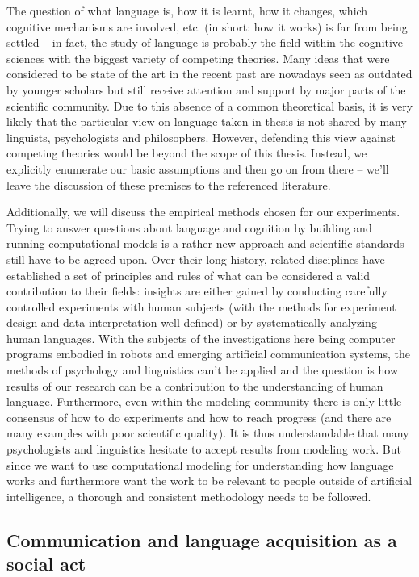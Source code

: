 The question of what language is, how it is learnt, how it changes,
which cognitive mechanisms are involved, etc. (in short: how it works)
is far from being settled -- in fact, the study of language is
probably the field within the cognitive sciences with the biggest
variety of competing theories. Many ideas that were considered to be
state of the art in the recent past are nowadays seen as outdated by
younger scholars but still receive attention and support by major
parts of the scientific community. Due to this absence of a common
theoretical basis, it is very likely that the particular view on
language taken in thesis is not shared by many linguists,
psychologists and philosophers. However, defending this view against
competing theories would be beyond the scope of this thesis. Instead,
we explicitly enumerate our basic assumptions and then go on from
there -- we'll leave the discussion of these premises to the
referenced literature.

Additionally, we will discuss the empirical methods chosen for our
experiments. Trying to answer questions about language and cognition
by building and running computational models is a rather new approach
and scientific standards still have to be agreed upon. Over their long
history, related disciplines have established a set of principles and
rules of what can be considered a valid contribution to their fields:
insights are either gained by conducting carefully controlled
experiments with human subjects (with the methods for experiment
design and data interpretation well defined) or by systematically
analyzing human languages. With the subjects of the investigations
here being computer programs embodied in robots and emerging
artificial communication systems, the methods of psychology and
linguistics can't be applied and the question is how results of our
research can be a contribution to the understanding of human
language. Furthermore, even within the modeling community there is
only little consensus of how to do experiments and how to reach
progress (and there are many examples with poor scientific
quality). It is thus understandable that many psychologists and
linguistics hesitate to accept results from modeling work. But since
we want to use computational modeling for understanding how language
works and furthermore want the work to be relevant to people outside
of artificial intelligence, a thorough and consistent methodology
needs to be followed.


\subsection{Communication and language acquisition as a social act}
\label{s:communication-as-a-social-act}

